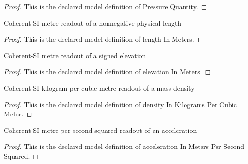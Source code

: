 \begin{proof}
  This is the declared model definition of Pressure Quantity.
\end{proof}
\begin{definition}
  \label{def:physics:phyx-mini-0394:phyxminiproblems-problemphyxmini0394-lengthinmeters}
  Coherent-SI metre readout of a nonnegative physical length
\end{definition}
\begin{proof}
  This is the declared model definition of length In Meters.
\end{proof}
\begin{definition}
  \label{def:physics:phyx-mini-0394:phyxminiproblems-problemphyxmini0394-elevationinmeters}
  Coherent-SI metre readout of a signed elevation
\end{definition}
\begin{proof}
  This is the declared model definition of elevation In Meters.
\end{proof}
\begin{definition}
  \label{def:physics:phyx-mini-0394:phyxminiproblems-problemphyxmini0394-densityinkilogramspercubicmeter}
  Coherent-SI kilogram-per-cubic-metre readout of a mass density
\end{definition}
\begin{proof}
  This is the declared model definition of density In Kilograms Per Cubic Meter.
\end{proof}
\begin{definition}
  \label{def:physics:phyx-mini-0394:phyxminiproblems-problemphyxmini0394-accelerationinmeterspersecondsquared}
  Coherent-SI metre-per-second-squared readout of an acceleration
\end{definition}
\begin{proof}
  This is the declared model definition of acceleration In Meters Per Second Squared.
\end{proof}
